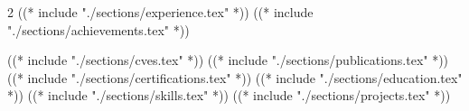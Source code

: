 

\begin{paracol}{2}
((* include "./sections/experience.tex" *))
\newpage
((* include "./sections/achievements.tex" *))

\switchcolumn

((* include "./sections/cves.tex" *))
((* include "./sections/publications.tex" *))
((* include "./sections/certifications.tex" *))
((* include "./sections/education.tex" *))
((* include "./sections/skills.tex" *))
\newpage
((* include "./sections/projects.tex" *))

\end{paracol}

